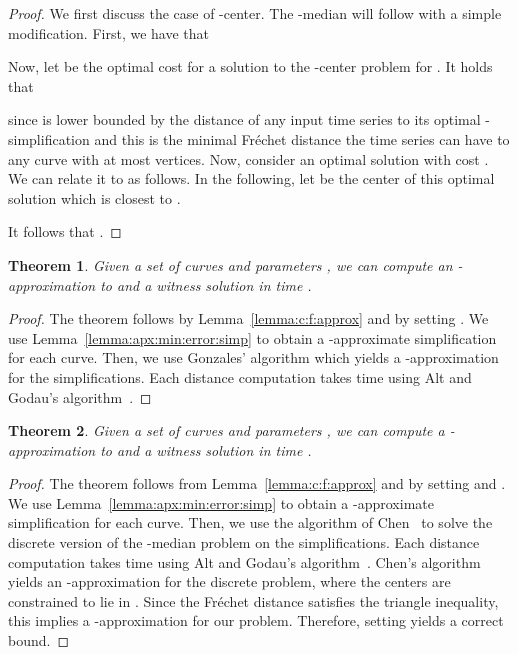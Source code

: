\documentclass[11pt, letter]{article}
\newtheorem{theorem}{Theorem}[section]
\newcommand{\thmlab}[1]{{\label{theo:#1}}}
\newcommand{\lemref}[1]{Lemma~\ref{lemma:#1}}
\newcommand{\Frechet}{Fr\'echet\xspace}
\begin{document}
\begin{proof}
We first discuss the case of -center. The
-median will follow with a simple modification.
First, we have that 


Now, let  be the optimal cost for a solution to the -center problem
 for .
It holds that 

since  is lower bounded by the distance of any input time series to its optimal
-simplification and this is the minimal \Frechet distance the time series can have to any curve
with at most  vertices. 
Now, consider an optimal solution  with cost . We can relate it to
 as follows. In the following, let  be the center of this
optimal solution which is closest to .

It follows that . 

\end{proof}

\begin{theorem}\thmlab{cf:approx:center:main}
Given a set of  curves  and parameters ,
we can compute an -approximation to 
and a witness solution in time .
\end{theorem}
\begin{proof}
The theorem follows by \lemref{c:f:approx} and by setting .  We
use \lemref{apx:min:error:simp} to obtain a -approximate simplification for
each curve.  Then, we use Gonzales' algorithm which yields a -approximation
for the simplifications. Each distance computation takes  time using Alt and Godau's algorithm~\cite{ag-cfdbt-95}.
\end{proof}


\begin{theorem}\thmlab{cf:approx:median:main}
Given a set of  curves  and parameters ,
we can compute a -approximation to 
and a witness solution in time .
\end{theorem}
\begin{proof}
The theorem follows from \lemref{c:f:approx} and by setting  and
.  We use \lemref{apx:min:error:simp} to obtain a -approximate
simplification for each curve.  Then, we use the algorithm of
Chen~\cite{c-kmc-09} to solve the discrete version of the -median problem on
the simplifications.  Each distance computation takes  time using Alt and Godau's algorithm~\cite{ag-cfdbt-95}.
Chen's algorithm yields an -approximation for the discrete problem, where
the centers are constrained to lie in .  Since the \Frechet distance
satisfies the triangle inequality, this implies a -approximation for our
problem. Therefore, setting  yields a correct bound.
\end{proof}
\end{document}
